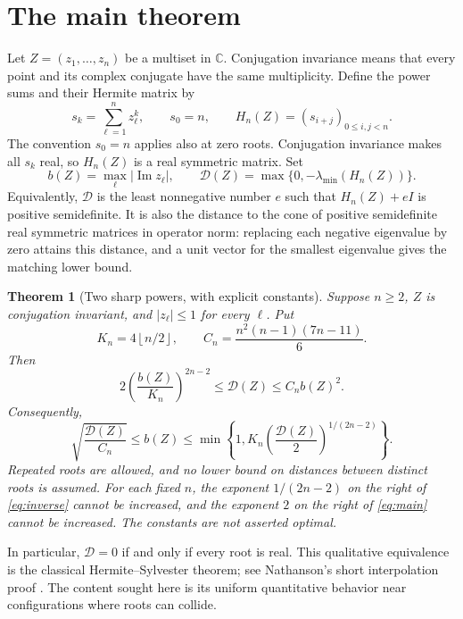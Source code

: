 \documentclass[11pt]{article}
\newtheorem{theorem}{Theorem}[section]
\theoremstyle{definition}
\newcommand{\C}{\mathbb C}
\newcommand{\Impart}{\operatorname{Im}}
\newcommand{\defect}{\mathcal D}
\newcommand{\floor}[1]{\left\lfloor#1\right\rfloor}
\begin{document}
\section{The main theorem}

Let $Z=(z_1,\ldots,z_n)$ be a multiset in $\C$. Conjugation invariance means
that every point and its complex conjugate have the same multiplicity.
Define the power sums and their Hermite matrix by
\begin{equation}
 s_k=\sum_{\ell=1}^n z_\ell^k,\qquad s_0=n,
 \qquad H_n(Z)=(s_{i+j})_{0\leq i,j<n}.
 \label{eq:hermite}
\end{equation}
The convention $s_0=n$ applies also at zero roots. Conjugation invariance
makes all $s_k$ real, so $H_n(Z)$ is a real symmetric matrix. Set
\begin{equation}
 b(Z)=\max_\ell|\Impart z_\ell|,
 \qquad \defect(Z)=\max\{0,-\lambda_{\min}(H_n(Z))\}.
 \label{eq:defect}
\end{equation}
Equivalently, $\defect$ is the least nonnegative number $e$ such that
$H_n(Z)+eI$ is positive semidefinite. It is also the distance to the cone of
positive semidefinite real symmetric matrices in operator norm: replacing
each negative eigenvalue by zero attains this distance, and a unit vector
for the smallest eigenvalue gives the matching lower bound.

\begin{theorem}[Two sharp powers, with explicit constants]
\label{thm:main}
Suppose $n\geq2$, $Z$ is conjugation invariant, and $|z_\ell|\leq1$ for
every $\ell$. Put
\[
 K_n=4\floor{n/2},\qquad
 C_n=\frac{n^2(n-1)(7n-11)}6.
\]
Then
\begin{equation}
 \boxed{\quad
 2\left(\frac{b(Z)}{K_n}\right)^{2n-2}
 \leq\defect(Z)\leq C_n b(Z)^2.
 \quad}
 \label{eq:main}
\end{equation}
Consequently,
\begin{equation}
 \sqrt{\frac{\defect(Z)}{C_n}}
 \leq b(Z)\leq
 \min\left\{1,K_n\left(\frac{\defect(Z)}2\right)^{1/(2n-2)}\right\}.
 \label{eq:inverse}
\end{equation}
Repeated roots are allowed, and no lower bound on distances between distinct
roots is assumed. For each fixed $n$, the exponent $1/(2n-2)$ on the right
of \eqref{eq:inverse} cannot be increased, and the exponent $2$ on the right
of \eqref{eq:main} cannot be increased. The constants are not asserted optimal.
\end{theorem}

In particular, $\defect=0$ if and only if every root is real. This qualitative
equivalence is the classical Hermite--Sylvester theorem; see Nathanson's
short interpolation proof \cite{nathanson}. The content sought here is its
uniform quantitative behavior near configurations where roots can collide.
\end{document}
